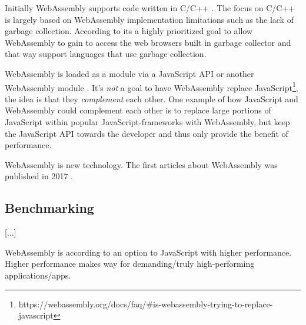 Initially WebAssembly supports code written in C/C++ \parencite{HaasRossbergSchuffTitzerHolmanGohmanWagnerZakaiBastien2017}. 
The focus on C/C++ is largely based on WebAssembly implementation limitations such as the lack of garbage collection. According to \textcite{HaasRossbergSchuffTitzerHolmanGohmanWagnerZakaiBastien2017} its a highly prioritized goal to allow WebAssembly to gain to access the web browsers built in garbage collector and that way support languages that use garbage collection.

WebAssembly is loaded as a module via a JavaScript API or another WebAssembly module \parencite{HaasRossbergSchuffTitzerHolmanGohmanWagnerZakaiBastien2017}. It's \emph{not} a goal to have WebAssembly replace JavaScript\footnote{https://webassembly.org/docs/faq/\#is-webassembly-trying-to-replace-javascript}, the idea is that they \emph{complement} each other. One example of how JavaScript and WebAssembly could complement each other is to replace large portions of JavaScript within popular JavaScript-frameworks with WebAssembly, but keep the JavaScript API towards the developer and thus only provide the benefit of performance.

WebAssembly is new technology. The first articles about WebAssembly was published in 2017 \parencite{HaasRossbergSchuffTitzerHolmanGohmanWagnerZakaiBastien2017,ReiserBlaser2017}.

\subsection{Benchmarking}

\parencite{LehmannPradel2018,MalleGiulianiKiesebergHolzinger2018}

[...]

WebAssembly is according to \textcite{HaasRossbergSchuffTitzerHolmanGohmanWagnerZakaiBastien2017} an option to JavaScript with higher performance. Higher performance makes way for demanding/truly high-performing applications/apps.
